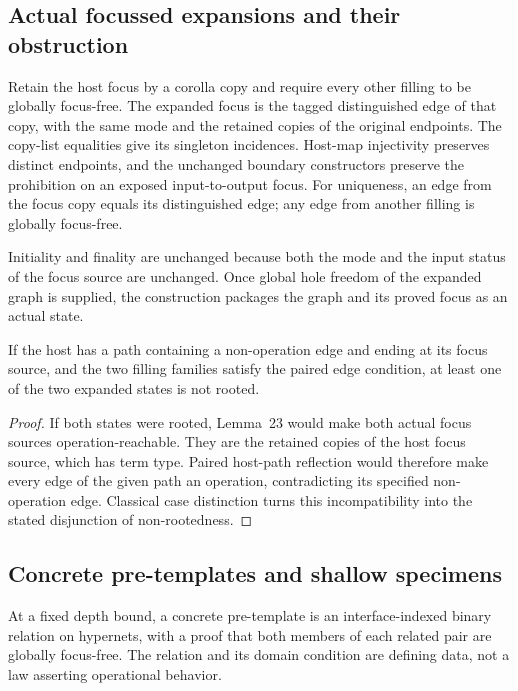 \subsection{Actual focussed expansions and their obstruction}
Retain the host focus by a corolla copy and require every other filling to
be globally focus-free. The expanded focus is the tagged distinguished edge
of that copy, with the same mode and the retained copies of the original
endpoints. The copy-list equalities give its singleton incidences. Host-map
injectivity preserves distinct endpoints, and the unchanged boundary
constructors preserve the prohibition on an exposed input-to-output focus.
For uniqueness, an edge from the focus copy equals its distinguished edge;
any edge from another filling is globally focus-free.

Initiality and finality are unchanged because both the mode and the input
status of the focus source are unchanged. Once global hole freedom of the
expanded graph is supplied, the construction packages the graph and its
proved focus as an actual state.

\begin{theorem}
If the host has a path containing a non-operation edge and ending at its
focus source, and the two filling families satisfy the paired edge condition,
at least one of the two expanded states is not rooted.
\end{theorem}
\begin{proof}
If both states were rooted, Lemma~23 would make both actual focus sources
operation-reachable. They are the retained copies of the host focus source,
which has term type. Paired host-path reflection would therefore make every
edge of the given path an operation, contradicting its specified non-operation
edge. Classical case distinction turns this incompatibility into the stated
disjunction of non-rootedness.
\end{proof}

\subsection{Concrete pre-templates and shallow specimens}
\label{sec:shallow-specimens}
\begin{definition}\label{term:concrete-pre-template}
At a fixed depth bound, a concrete pre-template is an interface-indexed
binary relation on hypernets, with a proof that both members of each related
pair are globally focus-free. The relation and its domain condition are
defining data, not a law asserting operational behavior.
\end{definition}

